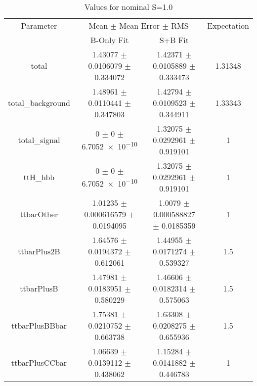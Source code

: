 \begin{table}
\centering
\caption{Values for nominal S=1.0}
\begin{tabular}{cccc}
\toprule
Parameter & \multicolumn{2}{c}{Mean $\pm$ Mean Error $\pm$ RMS} & Expectation\\
 & B-Only Fit & S+B Fit & \\
\midrule
total & \num{1.43077} $\pm$ \num{0.0106079} $\pm$ \num{0.334072} & \num{1.42371} $\pm$ \num{0.0105889} $\pm$ \num{0.333473} & \num{1.31348}\\
total\_background & \num{1.48961} $\pm$ \num{0.0110441} $\pm$ \num{0.347803} & \num{1.42794} $\pm$ \num{0.0109523} $\pm$ \num{0.344911} & \num{1.33343}\\
total\_signal & \num{0} $\pm$ \num{0} $\pm$ \num{6.7052e-10} & \num{1.32075} $\pm$ \num{0.0292961} $\pm$ \num{0.919101} & \num{1}\\
ttH\_hbb & \num{0} $\pm$ \num{0} $\pm$ \num{6.7052e-10} & \num{1.32075} $\pm$ \num{0.0292961} $\pm$ \num{0.919101} & \num{1}\\
ttbarOther & \num{1.01235} $\pm$ \num{0.000616579} $\pm$ \num{0.0194095} & \num{1.0079} $\pm$ \num{0.000588827} $\pm$ \num{0.0185359} & \num{1}\\
ttbarPlus2B & \num{1.64576} $\pm$ \num{0.0194372} $\pm$ \num{0.612061} & \num{1.44955} $\pm$ \num{0.0171274} $\pm$ \num{0.539327} & \num{1.5}\\
ttbarPlusB & \num{1.47981} $\pm$ \num{0.0183951} $\pm$ \num{0.580229} & \num{1.46606} $\pm$ \num{0.0182314} $\pm$ \num{0.575063} & \num{1.5}\\
ttbarPlusBBbar & \num{1.75381} $\pm$ \num{0.0210752} $\pm$ \num{0.663738} & \num{1.63308} $\pm$ \num{0.0208275} $\pm$ \num{0.655936} & \num{1.5}\\
ttbarPlusCCbar & \num{1.06639} $\pm$ \num{0.0139112} $\pm$ \num{0.438062} & \num{1.15284} $\pm$ \num{0.0141882} $\pm$ \num{0.446783} & \num{1}\\
\bottomrule
\end{tabular}
\end{table}